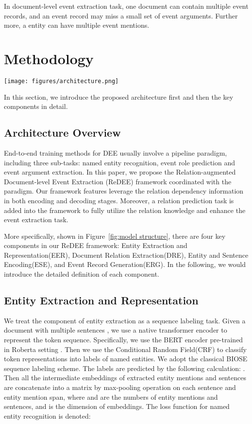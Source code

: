 \documentclass[11pt]{article}
\begin{document}
In document-level event extraction task, one document can contain multiple event records, and an event record may miss a small set of event arguments. Further more, a entity can have multiple event mentions.


\section{Methodology}

\begin{figure*}
    \centering
    \texttt{[image: figures/architecture.png]}
    \caption{Overall of our proposed ReDEE framework.}
    \label{fig:model structure}
\end{figure*}

In this section, we introduce the proposed architecture first and then the key components in detail. 

\subsection{Architecture Overview}

End-to-end training methods for DEE usually involve a pipeline paradigm, including three sub-tasks: named entity recognition, event role prediction and event argument extraction. In this paper, we propose the Relation-augmented Document-level Event Extraction (ReDEE) framework coordinated with the paradigm. Our framework features leverage the relation dependency information in both encoding and decoding stages. Moreover, a relation prediction task is added into the framework to fully utilize the relation knowledge and enhance the event extraction task.

More specifically, shown in Figure~\ref{fig:model structure}, there are four key components in our ReDEE framework: Entity Extraction and Representation(EER), Document Relation Extraction(DRE), Entity and Sentence Encoding(ESE), and Event Record Generation(ERG). In the following, we would introduce the detailed definition of each component.



\subsection{Entity Extraction and Representation}

We treat the component of entity extraction as a sequence labeling task. Given a document  with multiple sentences , we use a native transformer encoder to represent the token sequence. Specifically, we use the BERT \cite{bert} encoder pre-trained in Roberta setting \cite{roberta}. Then we use the Conditional Random Field(CRF) \cite{CRF} to classify token representations into labels of named entities. We adopt the classical BIOSE sequence labeling scheme. The labels are predicted by the following calculation: . Then all the intermediate embeddings of extracted entity mentions and sentences are concatenate into a matrix  by max-pooling operation on each sentence and entity mention span, where  and  are the numbers of entity mentions and sentences, and  is the dimension of embeddings. The loss function for named entity recognition is denoted:
\end{document}
